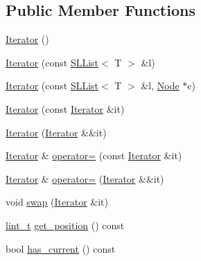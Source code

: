 \subsection*{Public Member Functions}
\begin{DoxyCompactItemize}
\item 
\hyperlink{class_designar_1_1_s_l_list_1_1_iterator_a8c1c1f8110e22d81401e404c53003156}{Iterator} ()
\item 
\hyperlink{class_designar_1_1_s_l_list_1_1_iterator_a280b63ef5b720adb076806270cd9e8ec}{Iterator} (const \hyperlink{class_designar_1_1_s_l_list}{S\+L\+List}$<$ T $>$ \&l)
\item 
\hyperlink{class_designar_1_1_s_l_list_1_1_iterator_a56a2a893f109ea2158b183c3efaff8a3}{Iterator} (const \hyperlink{class_designar_1_1_s_l_list}{S\+L\+List}$<$ T $>$ \&l, \hyperlink{class_designar_1_1_node_s_l_list_a41963019ada1025099e3259207a3de96}{Node} $\ast$c)
\item 
\hyperlink{class_designar_1_1_s_l_list_1_1_iterator_ae6726c755567d34649157c075b825a20}{Iterator} (const \hyperlink{class_designar_1_1_s_l_list_1_1_iterator}{Iterator} \&it)
\item 
\hyperlink{class_designar_1_1_s_l_list_1_1_iterator_a2d8fece759af352a51982b4ffb25f351}{Iterator} (\hyperlink{class_designar_1_1_s_l_list_1_1_iterator}{Iterator} \&\&it)
\item 
\hyperlink{class_designar_1_1_s_l_list_1_1_iterator}{Iterator} \& \hyperlink{class_designar_1_1_s_l_list_1_1_iterator_ab6a8bedc6dc57d1255464d4ea942bdf5}{operator=} (const \hyperlink{class_designar_1_1_s_l_list_1_1_iterator}{Iterator} \&it)
\item 
\hyperlink{class_designar_1_1_s_l_list_1_1_iterator}{Iterator} \& \hyperlink{class_designar_1_1_s_l_list_1_1_iterator_a9215becbdd87b11db7f6481e96df9343}{operator=} (\hyperlink{class_designar_1_1_s_l_list_1_1_iterator}{Iterator} \&\&it)
\item 
void \hyperlink{class_designar_1_1_s_l_list_1_1_iterator_afbb40762fe2a3c8ecea8fb26751492e0}{swap} (\hyperlink{class_designar_1_1_s_l_list_1_1_iterator}{Iterator} \&it)
\item 
\hyperlink{namespace_designar_a9d113d66a39e82b73727c72cd3a52f73}{lint\+\_\+t} \hyperlink{class_designar_1_1_s_l_list_1_1_iterator_a2105a92f98b381c1dc9cdc138e96a22a}{get\+\_\+position} () const
\item 
bool \hyperlink{class_designar_1_1_s_l_list_1_1_iterator_ab245268535b61d073d615dc969bcaf5a}{has\+\_\+current} () const
\item 

\end{DoxyCompactItemize}
